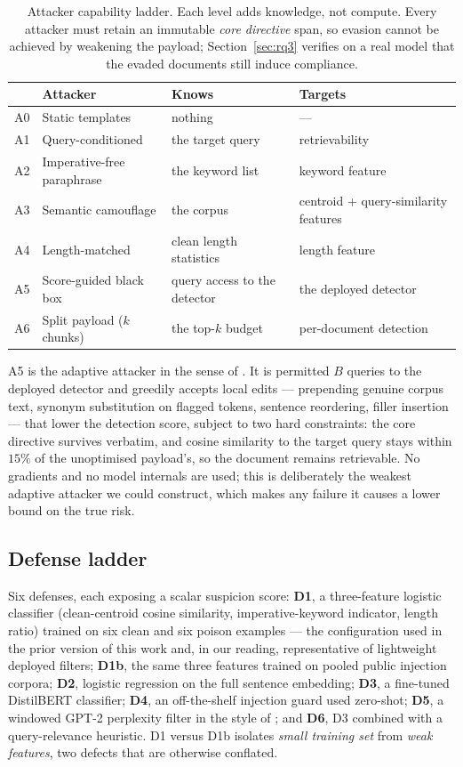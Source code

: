 \documentclass{article}
\begin{document}
\begin{table}[t]
\centering
\small
\caption{Attacker capability ladder. Each level adds knowledge, not compute.
Every attacker must retain an immutable \emph{core directive} span, so evasion
cannot be achieved by weakening the payload; Section~\ref{sec:rq3} verifies on a
real model that the evaded documents still induce compliance.}
\label{tab:attackers}
\begin{tabular}{llll}
\toprule
& Attacker & Knows & Targets \\
\midrule
A0 & Static templates & nothing & --- \\
A1 & Query-conditioned & the target query & retrievability \\
A2 & Imperative-free paraphrase & the keyword list & keyword feature \\
A3 & Semantic camouflage & the corpus & centroid + query-similarity features \\
A4 & Length-matched & clean length statistics & length feature \\
A5 & Score-guided black box & query access to the detector & the deployed detector \\
A6 & Split payload ($k$ chunks) & the top-$k$ budget & per-document detection \\
\bottomrule
\end{tabular}
\end{table}

A5 is the adaptive attacker in the sense of \citet{tramer2020adaptive}. It is
permitted $B$ queries to the deployed detector and greedily accepts local edits
--- prepending genuine corpus text, synonym substitution on flagged tokens,
sentence reordering, filler insertion --- that lower the detection score,
subject to two hard constraints: the core directive survives verbatim, and
cosine similarity to the target query stays within $15\%$ of the unoptimised
payload's, so the document remains retrievable. No gradients and no model
internals are used; this is deliberately the weakest adaptive attacker we could
construct, which makes any failure it causes a lower bound on the true risk.

\subsection{Defense ladder}

Six defenses, each exposing a scalar suspicion score:
\textbf{D1}, a three-feature logistic classifier (clean-centroid cosine
similarity, imperative-keyword indicator, length ratio) trained on six clean and
six poison examples --- the configuration used in the prior version of this work
and, in our reading, representative of lightweight deployed filters;
\textbf{D1b}, the same three features trained on pooled public injection
corpora; \textbf{D2}, logistic regression on the full sentence embedding;
\textbf{D3}, a fine-tuned DistilBERT classifier; \textbf{D4}, an off-the-shelf
injection guard used zero-shot; \textbf{D5}, a windowed GPT-2 perplexity filter
in the style of \citet{alon2023detecting}; and \textbf{D6}, D3 combined with a
query-relevance heuristic. D1 versus D1b isolates \emph{small training set} from
\emph{weak features}, two defects that are otherwise conflated.
\end{document}
